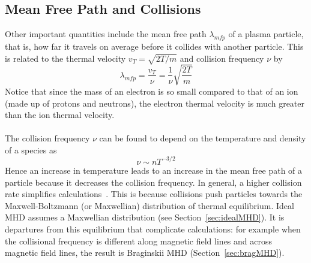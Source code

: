 \subsection{Mean Free Path and Collisions}
Other important quantities include the mean free path $\lambda_{mfp}$ of a plasma particle, that is, how far it travels on average before it collides with another particle. This is related to the thermal velocity $v_T=\sqrt{2T/m}$ and collision frequency $\nu$ by
\begin{equation}
  \lambda_{mfp}=\frac{v_T}{\nu}=\frac1\nu\sqrt{\frac{2T}{m}}
\end{equation}
Notice that since the mass of an electron is so small compared to that of an ion (made up of protons and neutrons), the electron thermal velocity is much greater than the ion thermal velocity.\\
\\
The collision frequency $\nu$ can be found to depend on the temperature and density of a species as
\begin{equation}
  \nu\sim nT^{-3/2}
\end{equation}
Hence an increase in temperature leads to an increase in the mean free path of a particle because it decreases the collision frequency. In general, a higher collision rate simplifies calculations~\cite{Hazeltine}. This is because collisions push particles towards the Maxwell-Boltzmann (or Maxwellian) distribution of thermal equilibrium. Ideal MHD assumes a Maxwellian distribution (see Section~\ref{sec:idealMHD}). It is departures from this equilibrium that complicate calculations: for example when the collisional frequency is different along magnetic field lines and across magnetic field lines, the result is Braginskii MHD (Section~\ref{sec:bragMHD}).

